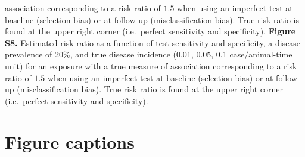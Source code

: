 \documentclass[utf8]{frontiersSCNS}\usepackage[]{graphicx}\usepackage[]{color}
\begin{document}
association corresponding to a risk ratio of \(1.5\) when using an imperfect
test at baseline (selection bias) or at follow-up (misclassification bias). True
risk ratio is found at the upper right corner (i.e.\ perfect sensitivity and
specificity).
\textbf{Figure S8.} Estimated risk ratio as a function of test sensitivity and
specificity, a disease prevalence of 20\%, and true disease incidence (0.01,
0.05, 0.1 case/animal-time unit) for an exposure with a true measure of
association corresponding to a risk ratio of \(1.5\) when using an imperfect
test at baseline (selection bias) or at follow-up (misclassification bias). True
risk ratio is found at the upper right corner (i.e.\ perfect sensitivity and
specificity).




\section*{Figure captions}

\end{document}
